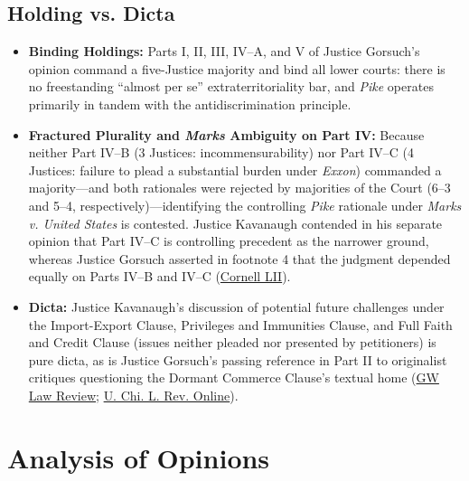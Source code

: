 \documentclass[12pt]{article}
\begin{document}
\subsection{Holding vs. Dicta}
\begin{itemize}
\item \textbf{Binding Holdings:} Parts I, II, III, IV--A, and V of Justice Gorsuch's opinion command a five-Justice majority and bind all lower courts: there is no freestanding ``almost per se'' extraterritoriality bar, and \textit{Pike} operates primarily in tandem with the antidiscrimination principle.
\item \textbf{Fractured Plurality and \textit{Marks} Ambiguity on Part IV:} Because neither Part IV--B (3 Justices: incommensurability) nor Part IV--C (4 Justices: failure to plead a substantial burden under \textit{Exxon}) commanded a majority---and both rationales were rejected by majorities of the Court (6--3 and 5--4, respectively)---identifying the controlling \textit{Pike} rationale under \textit{Marks v. United States} is contested. Justice Kavanaugh contended in his separate opinion that Part IV--C is controlling precedent as the narrower ground, whereas Justice Gorsuch asserted in footnote 4 that the judgment depended equally on Parts IV--B and IV--C (\href{https://www.law.cornell.edu/supremecourt/text/21-468}{Cornell LII}).
\item \textbf{Dicta:} Justice Kavanaugh's discussion of potential future challenges under the Import-Export Clause, Privileges and Immunities Clause, and Full Faith and Credit Clause (issues neither pleaded nor presented by petitioners) is pure dicta, as is Justice Gorsuch's passing reference in Part II to originalist critiques questioning the Dormant Commerce Clause's textual home (\href{https://www.gwlr.org/national-pork-producers-council-v-ross-a-win-for-farmed-pigs/}{GW Law Review}; \href{https://lawreview.uchicago.edu/online-archive/national-pork-producers-council-v-ross-invitation-revisit-import-export-clause}{U. Chi. L. Rev. Online}).
\end{itemize}

\section{Analysis of Opinions}
\end{document}

